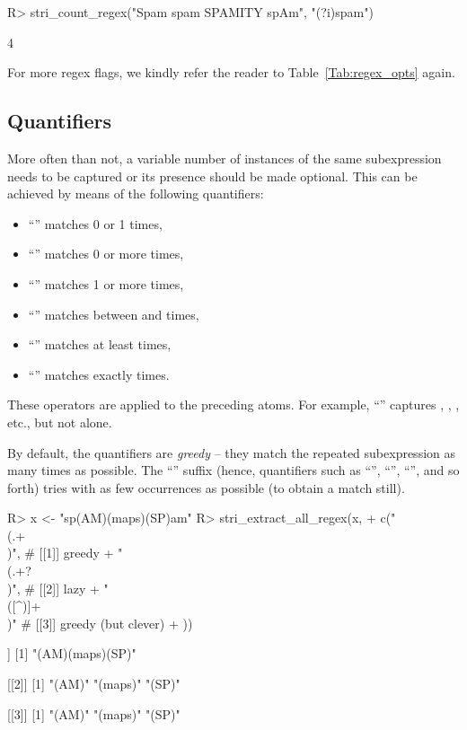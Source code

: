 \documentclass[nojss]{jss}
\begin{document}
\begin{Schunk}
\begin{Sinput}
R> stri_count_regex("Spam spam SPAMITY spAm", "(?i)spam")
\end{Sinput}
\begin{Soutput}
[1] 4
\end{Soutput}
\end{Schunk}

For more regex flags, we kindly refer the reader to Table~\ref{Tab:regex_opts} again.




\subsection{Quantifiers}

More often than not, a variable number of
instances of the same subexpression needs to be captured
or its presence should be made optional.
This can be achieved by means of the following quantifiers:
\begin{itemize}
\item ``'' matches 0 or 1 times,
\item ``\code{*}'' matches 0 or more times,
\item ``\code{+}'' matches 1 or more times,
\item ``'' matches between  and  times,
\item ``'' matches at least  times,
\item ``'' matches exactly  times.
\end{itemize}
These operators are applied to the preceding atoms.
For example, ``'' captures
, , , etc., but not  alone.


By default, the quantifiers are \textit{greedy} -- they match the
repeated subexpression as many times as possible. The ``'' suffix
(hence, quantifiers such as ``'', ``'', ``'', and so forth) tries with
as few occurrences as possible (to obtain a match still).


\begin{Schunk}
\begin{Sinput}
R> x <- "sp(AM)(maps)(SP)am"
R> stri_extract_all_regex(x,
+    c("\\(.+\\)",    # [[1]] greedy
+      "\\(.+?\\)",   # [[2]] lazy
+      "\\([^)]+\\)"  # [[3]] greedy (but clever)
+  ))
\end{Sinput}
\begin{Soutput}
[[1]]
[1] "(AM)(maps)(SP)"

[[2]]
[1] "(AM)"   "(maps)" "(SP)"

[[3]]
[1] "(AM)"   "(maps)" "(SP)"
\end{Soutput}
\end{Schunk}
\end{document}
